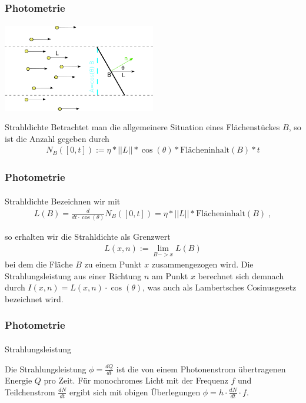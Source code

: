 \documentclass{beamer}
\begin{document}
\begin{frame}
    \frametitle{Photometrie}
\framesubtitle{}

\begin{center}

    \includegraphics[width=0.5\textwidth]{images/Strahldichte.png}
\end{center}


\begin{block}{Strahldichte}
 Betrachtet man die allgemeinere Situation eines Flächenstückes $B$, so ist die Anzahl gegeben durch 
\begin{align}
N_B([0,t]) := \eta * ||L||  * \cos(\theta) *  \text{Flächeninhalt} (B) * t
 \end{align}


\end{block}
\end{frame}




\begin{frame}
    \frametitle{Photometrie}
\framesubtitle{}

\begin{block}{Strahldichte}
Bezeichnen wir mit 
\begin{align*}
L(B) = \frac{d}{dt \cdot \cos(\theta)}N_B([0,t]) = \eta * ||L||  *  \text{Flächeninhalt} (B) \; , 
 \end{align*}

so erhalten wir die   Strahldichte als Grenzwert
\begin{align*}
L(x, n):= \lim_{B -> x} L(B)
 \end{align*}
bei dem die Fläche $B$  zu einem Punkt $x$ zusammengezogen wird.  Die Strahlungsleistung aus einer Richtung $n$  am Punkt $x$ berechnet sich demnach durch $I(x, n) = L(x, n) \cdot \cos(\theta)$, was auch als Lambertsches Cosinusgesetz bezeichnet wird.
\end{block}
\end{frame}
 

\begin{frame}
    \frametitle{Photometrie}
\framesubtitle{}
\begin{block}{Strahlungsleistung}

Die Strahlungsleistung $\phi = \frac{d Q}{dt}$ ist die von einem Photonenstrom übertragenen Energie $Q$ pro Zeit. 
Für monochromes Licht mit der Frequenz $f$ und Teilchenstrom $ \frac{d N}{dt} $ ergibt sich mit obigen Überlegungen $\phi = h \cdot  \frac{d N}{dt}  \cdot f$.
\end{block}
\end{frame}
\end{document}
